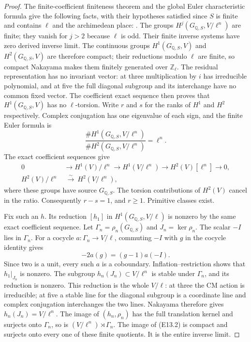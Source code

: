 \begin{proof}
The finite-coefficient finiteness theorem and the global Euler
characteristic formula give the following facts, with their
hypotheses satisfied since $S$ is finite and contains $\ell$
and the archimedean place:
\cite[I.4.10(c), I.4.15, and I.5.1]{E_density_MilneADT}.
The groups $H^j(G_{\mathbb Q,S},V/\ell^n)$ are finite;
they vanish for $j>2$ because $\ell$ is odd.
Their finite inverse systems have zero derived inverse limit.
The continuous groups $H^1(G_{\mathbb Q,S},V)$ and
$H^2(G_{\mathbb Q,S},V)$ are therefore compact; their reductions
modulo $\ell$ are finite, so compact Nakayama makes them finitely
generated over $\mathbb Z_\ell$.
The residual representation has no invariant vector: at three
multiplication by $i$ has irreducible polynomial, and at five
the full diagonal subgroup and its interchange have no common
fixed vector.  The coefficient exact sequence then proves that
$H^1(G_{\mathbb Q,S},V)$ has no $\ell$-torsion.
Write $r$ and $s$ for the ranks of $H^1$ and $H^2$ respectively.
Complex conjugation has one eigenvalue of each sign, and the
finite Euler formula is
\[
 \frac{\#H^1(G_{\mathbb Q,S},V/\ell^n)}
      {\#H^2(G_{\mathbb Q,S},V/\ell^n)}=\ell^n.
\]
The exact coefficient sequences give
\[
\begin{split}
0&\longrightarrow H^1(V)/\ell^n
 \longrightarrow H^1(V/\ell^n)
 \longrightarrow H^2(V)[\ell^n]\longrightarrow0,\\
H^2(V)/\ell^n&\ \xrightarrow{\sim}\ H^2(V/\ell^n),
\end{split}
\]
where these groups have source $G_{\mathbb Q,S}$.
The torsion contributions of $H^2(V)$ cancel in the ratio.
Consequently $r-s=1$, and $r\ge1$.  Primitive classes exist.

Fix such an $h$.  Its reduction $[h_1]$ in
$H^1(G_{\mathbb Q,S},V/\ell)$ is nonzero by the same exact
coefficient sequence.  Let $\Gamma_n=\rho_n(G_{\mathbb Q,S})$
and $J_n=\ker\rho_n$.  The scalar $-I$ lies in $\Gamma_n$.
For a cocycle $a:\Gamma_n\to V/\ell$, commuting $-I$ with $g$
in the cocycle identity gives
\[
       -2a(g)=(g-1)a(-I).
\]
Since two is a unit, every such $a$ is a coboundary.
Inflation--restriction shows that $h_1|_{J_n}$ is nonzero.
The subgroup $h_n(J_n)\subset V/\ell^n$ is stable under
$\Gamma_n$, and its reduction is nonzero.  This reduction is
the whole $V/\ell$: at three the CM action is irreducible;
at five a stable line for the diagonal subgroup is a coordinate
line and complex conjugation interchanges the two lines.
Nakayama therefore gives $h_n(J_n)=V/\ell^n$.
The image of $(h_n,\rho_n)$ has the full translation kernel
and surjects onto $\Gamma_n$, so is
$(V/\ell^n)\rtimes\Gamma_n$.
The image of (E13.2) is compact and surjects onto every one
of these finite quotients.  It is the entire inverse limit.
\end{proof}

